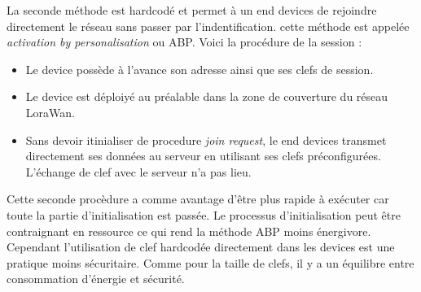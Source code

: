 La seconde méthode est hardcodé et permet à un end devices de rejoindre directement le réseau sans passer par l'indentification. cette méthode est appelée \textit{activation by personalisation} ou ABP. Voici la procédure de la session :
\begin{itemize}
\item Le device possède à l'avance son adresse ainsi que ses clefs de session.
\item Le device est déploiyé au préalable dans la zone de couverture du réseau LoraWan.
\item Sans devoir itinialiser de procedure \textit{join request}, le end devices transmet directement ses données au serveur en utilisant ses clefs préconfigurées. L'échange de clef avec le serveur n'a pas lieu.
\end{itemize}

Cette seconde procèdure a comme avantage d'être plus rapide à exécuter car toute la partie d'initialisation est passée. Le processus d'initialisation peut être contraignant en ressource ce qui rend la méthode ABP moins énergivore. Cependant l'utilisation de clef hardcodée directement dans les devices est une pratique moins sécuritaire. Comme pour la taille de clefs, il y a un équilibre entre consommation d'énergie et sécurité.
